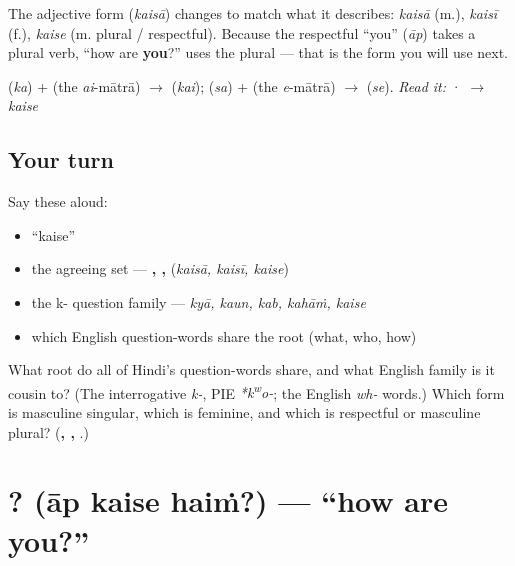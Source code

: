 \begin{grammarlens}[title={Grammar Lens: \hi{कैसा} agrees}]
The adjective form \textbf{} (\emph{kaisā}) changes to match what it describes: \emph{kaisā} (m.), \emph{kaisī} (f.), \emph{kaise} (m. plural / respectful). Because the respectful \textquotedblleft{}you\textquotedblright{} (\emph{āp}) takes a plural verb, \textquotedblleft{}how are \textbf{you}?\textquotedblright{} uses the plural \textbf{} — that is the form you will use next.
\end{grammarlens}

\begin{sounds}
 (\emph{ka}) +  (the \emph{ai}-mātrā) $\to$  (\emph{kai});  (\emph{sa}) +  (the \emph{e}-mātrā) $\to$  (\emph{se}). \emph{Read it:} · $\to$ \emph{kaise}
\end{sounds}

\subsection*{Your turn}
Say these aloud:

\begin{itemize}
\raggedright
  \item \textquotedblleft{}kaise\textquotedblright{}
  \item the agreeing set — \textbf{, , } (\emph{kaisā, kaisī, kaise})
  \item the k- question family — \emph{kyā, kaun, kab, kahāṁ, kaise}
  \item which English question-words share the root (what, who, how)
\end{itemize}

\begin{tcolorbox}[breakable,colback=teal!4,colframe=teal!35!black,title={Before you move on}]
What root do all of Hindi's question-words share, and what English family is it cousin to? (The interrogative \emph{k-}, PIE \emph{*k\textsuperscript{w}o-}; the English \emph{wh-} words.) Which form is masculine singular, which is feminine, and which is respectful or masculine plural? (\textbf{, , }.)
\end{tcolorbox}
\section[\texorpdfstring{\hi{आप} \hi{कैसे} \hi{हैं}? (āp kaise haiṁ?)}{आप कैसे हैं? (āp kaise haiṁ?)}]{  ? (āp kaise haiṁ?) — \textquotedblleft{}how are you?\textquotedblright{}}

